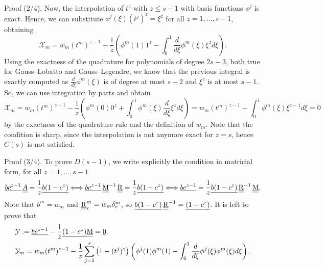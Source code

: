 \documentclass[aspectratio=169]{beamer}
\begin{document}
\begin{frame}
	\begin{block}{Proof (2/4).}
		Now, the interpolation of $t^z$ with $z\leq s-1$ with basis functions $\phi^j$ is exact. Hence, we can substitute $\phi^j(\xi)(t^j)^z  = \xi^z$ for all $z=1,\dots, s-1$, obtaining
		\begin{equation*}
			\mathcal{X}_m= w_m (t^{m})^{z-1} - \frac{1}{z} \left( \phi^m (1) 1^z - \int_0^1 \frac{d}{d\xi}\phi^m(\xi)\xi^z  d\xi  \right).
		\end{equation*}
		Using the exactness of the quadrature for polynomials of degree $2s-3$, both true for Gauss--Lobatto and Gauss--Legendre, we know that the previous integral is exactly computed as $\frac{d}{d\xi}\phi^m(\xi)$ is of degree at most $s-2$ and $\xi^z$ is at most $s-1$. So, we can use integration by parts and obtain
		\begin{equation*}
			\mathcal{X}_m= w_m (t^{m})^{z-1} - \frac{1}{z} \left( \phi^m (0) 0^z + \int_0^1 \phi^m(\xi)\frac{d}{d\xi}\xi^z  d\xi  \right) =  w_m (t^{m})^{z-1} - \int_0^1 \phi^m(\xi)\xi^{z-1}  d\xi =0
		\end{equation*}
		by the exactness of the quadrature rule and the definition of $w_m$. Note that the condition is sharp, since the interpolation is not anymore exact for $z=s$, hence $C(s)$ is not satisfied.\\
	\end{block}
\end{frame}

\begin{frame}
	\begin{block}{Proof (3/4).}
		To prove $D(s-1)$, we write explicitly the condition in matricial form, for all $z=1,\dots, s-1$
			\begin{align*}
				\underline{bc^{z-1}} \, \underline{\underline{A}} = \frac{1}{z} \underline{b(1-c^z)} 
				\Longleftrightarrow \underline{bc^{z-1}} \, \underline{\underline{\mathrm{M}}}^{-1} \, \underline{\underline{\mathrm{R}}} 
				= \frac{1}{z} \underline{b(1-c^z)}
				\Longleftrightarrow \underline{bc^{z-1}}  = \frac{1}{z} \underline{b(1-c^z)}\,
				\underline{\underline{\mathrm{R}}}^{-1}\, \underline{\underline{\mathrm{M}}}.
			\end{align*}
		Note that $b^m=w_m $ and $\underline{\underline{\mathrm{R}}}_r^m = w_m \delta_r^m$, 
		so $\underline{b(1-c^z)}\,\underline{\underline{\mathrm{R}}}^{-1}=\underline{(1-c^z)}$. It is left to prove that
		\begin{align*}
		&	\mathcal{Y}:=\underline{bc^{z-1}}-\frac1z\underline{(1-c^z)}\underline{\underline{\mathrm{M}}} =\underline{0}.\\
		&	\mathcal{Y}_m= w_m (t^m)^{z-1} - \frac1z\sum_{j=1}^s \left(1-(t^j)^z\right) \left(\phi^j(1)\phi^m(1) - \int_0^1 \frac{d}{d\xi}\phi^j(\xi)\phi^m(\xi) d\xi  \right).
		\end{align*}
			\end{block}
\end{frame}
\end{document}

